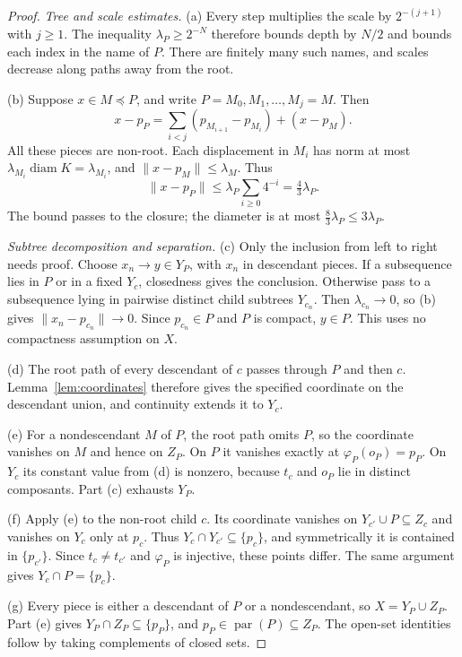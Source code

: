 \documentclass[11pt]{amsart}
\theoremstyle{definition}
\theoremstyle{remark}
\newcommand{\diam}{\operatorname{diam}}
\newcommand{\pa}{\operatorname{par}}
\begin{document}
\begin{proof}
\emph{Tree and scale estimates.} (a) Every step multiplies the scale by $2^{-(j+1)}$ with $j\ge1$. The inequality $\lambda_P\ge2^{-N}$ therefore bounds depth by $N/2$ and bounds each index in the name of $P$. There are finitely many such names, and scales decrease along paths away from the root.

(b) Suppose $x\in M\preceq P$, and write $P=M_0,M_1,\ldots,M_j=M$. Then
\[
x-p_P=\sum_{i<j}(p_{M_{i+1}}-p_{M_i})+(x-p_M).
\]
All these pieces are non-root. Each displacement in $M_i$ has norm at most $\lambda_{M_i}\diam K=\lambda_{M_i}$, and $\|x-p_M\|\le\lambda_M$. Thus
\[
\|x-p_P\|\le\lambda_P\sum_{i\ge0}4^{-i}=\tfrac43\lambda_P.
\]
The bound passes to the closure; the diameter is at most $\frac83\lambda_P\le3\lambda_P$.

\emph{Subtree decomposition and separation.} (c) Only the inclusion from left to right needs proof. Choose $x_n\to y\in Y_P$, with $x_n$ in descendant pieces. If a subsequence lies in $P$ or in a fixed $Y_c$, closedness gives the conclusion. Otherwise pass to a subsequence lying in pairwise distinct child subtrees $Y_{c_n}$. Then $\lambda_{c_n}\to0$, so (b) gives $\|x_n-p_{c_n}\|\to0$. Since $p_{c_n}\in P$ and $P$ is compact, $y\in P$. This uses no compactness assumption on $X$.

(d) The root path of every descendant of $c$ passes through $P$ and then $c$. Lemma~\ref{lem:coordinates} therefore gives the specified coordinate on the descendant union, and continuity extends it to $Y_c$.

(e) For a nondescendant $M$ of $P$, the root path omits $P$, so the coordinate vanishes on $M$ and hence on $Z_P$. On $P$ it vanishes exactly at $\varphi_P(o_P)=p_P$. On $Y_c$ its constant value from (d) is nonzero, because $t_c$ and $o_P$ lie in distinct composants. Part (c) exhausts $Y_P$.

(f) Apply (e) to the non-root child $c$. Its coordinate vanishes on $Y_{c'}\cup P\subseteq Z_c$ and vanishes on $Y_c$ only at $p_c$. Thus $Y_c\cap Y_{c'}\subseteq\{p_c\}$, and symmetrically it is contained in $\{p_{c'}\}$. Since $t_c\neq t_{c'}$ and $\varphi_P$ is injective, these points differ. The same argument gives $Y_c\cap P=\{p_c\}$.

(g) Every piece is either a descendant of $P$ or a nondescendant, so $X=Y_P\cup Z_P$. Part (e) gives $Y_P\cap Z_P\subseteq\{p_P\}$, and $p_P\in\pa(P)\subseteq Z_P$. The open-set identities follow by taking complements of closed sets.


\end{proof}
\end{document}
